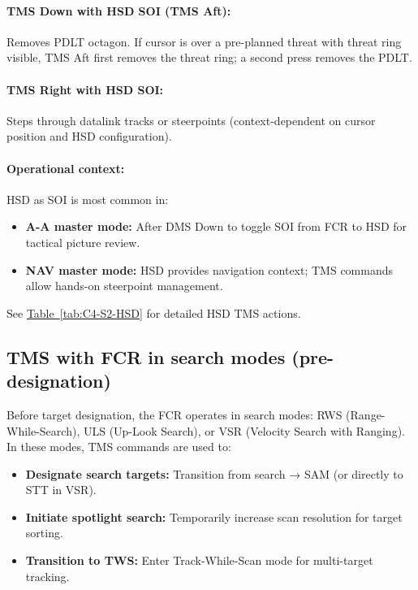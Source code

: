\documentclass[11pt, a4paper, twoside]{report}
\newcommand{\tabref}[1]{\hyperref[#1]{Table~\ref*{#1}}}
\begin{document}
\paragraph{TMS Down with HSD SOI (TMS Aft):}
Removes PDLT octagon. If cursor is over a pre-planned threat with threat ring visible, TMS Aft first removes the threat ring; a second press removes the PDLT.

\paragraph{TMS Right with HSD SOI:}
Steps through datalink tracks or steerpoints (context-dependent on cursor position and HSD configuration).

\paragraph{Operational context:}
HSD as SOI is most common in:
\begin{itemize}
    \item \textbf{A-A master mode:} After DMS Down to toggle SOI from FCR to HSD for tactical picture review.
    \item \textbf{NAV master mode:} HSD provides navigation context; TMS commands allow hands-on steerpoint management.
\end{itemize}

See \tabref{tab:C4-S2-HSD} for detailed HSD TMS actions.

\subsection{TMS with FCR in search modes (pre-designation)}
\label{sec:C4-S2-S2}

Before target designation, the FCR operates in search modes: RWS (Range-While-Search), ULS (Up-Look Search), or VSR (Velocity Search with Ranging). In these modes, TMS commands are used to:
\begin{itemize}
    \item \textbf{Designate search targets:} Transition from search → SAM (or directly to STT in VSR).
    \item \textbf{Initiate spotlight search:} Temporarily increase scan resolution for target sorting.
    \item \textbf{Transition to TWS:} Enter Track-While-Scan mode for multi-target tracking.
\end{itemize}
\end{document}

